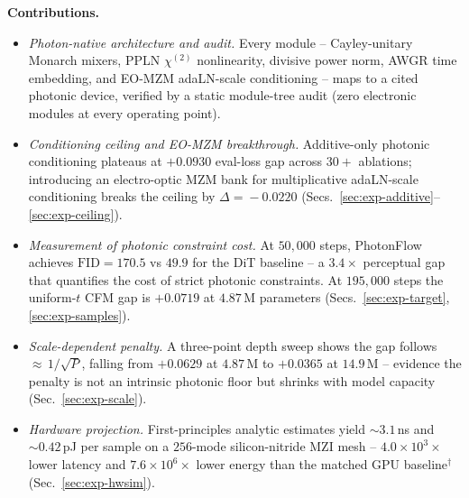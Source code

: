 \documentclass[conference]{IEEEtran}
\begin{document}
\textbf{Contributions.}
\begin{itemize}\itemsep1pt
\item \emph{Photon-native architecture and audit.}  Every module --
      Cayley-unitary Monarch mixers, PPLN $\chi^{(2)}$
      nonlinearity, divisive power norm, AWGR time embedding, and
      EO-MZM adaLN-scale conditioning -- maps to a cited photonic
      device, verified by a static module-tree audit (zero electronic
      modules at every operating point).
\item \emph{Conditioning ceiling and EO-MZM breakthrough.}
      Additive-only photonic conditioning plateaus at $+0.0930$
      eval-loss gap across $30{+}$ ablations; introducing an
      electro-optic MZM bank for multiplicative adaLN-scale
      conditioning breaks the ceiling by $\Delta\!=\!-0.0220$
      (Secs.~\ref{sec:exp-additive}--\ref{sec:exp-ceiling}).
\item \emph{Measurement of photonic constraint cost.}
      At $50{,}000$ steps, PhotonFlow achieves
      $\mathrm{FID}{=}170.5$ vs $49.9$ for the DiT baseline --
      a $3.4{\times}$ perceptual gap that quantifies the cost of
      strict photonic constraints.  At $195{,}000$ steps the
      uniform-$t$ CFM gap is $+0.0719$ at $4.87$\,M parameters
      (Secs.~\ref{sec:exp-target}, \ref{sec:exp-samples}).
\item \emph{Scale-dependent penalty.}  A three-point depth sweep
      shows the gap follows ${\approx}\,1/\sqrt{P}$, falling from
      $+0.0629$ at $4.87$\,M to $+0.0365$ at $14.9$\,M -- evidence
      the penalty is not an intrinsic photonic floor but shrinks
      with model capacity (Sec.~\ref{sec:exp-scale}).
\item \emph{Hardware projection.}  First-principles analytic
      estimates yield ${\sim}3.1$\,ns and ${\sim}0.42$\,pJ per
      sample on a $256$-mode silicon-nitride MZI mesh --
      $4.0{\times}10^3\times$ lower latency and $7.6{\times}10^6\times$
      lower energy than the matched GPU baseline$^\dagger$
      (Sec.~\ref{sec:exp-hwsim}).
\end{itemize}
\end{document}
